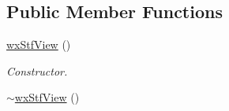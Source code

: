 \subsection*{Public Member Functions}
\begin{DoxyCompactItemize}
\item 
\hypertarget{classwxStfView_a6dc01863526872b6421facc8d7e80757}{
\hyperlink{classwxStfView_a6dc01863526872b6421facc8d7e80757}{wxStfView} ()}
\label{classwxStfView_a6dc01863526872b6421facc8d7e80757}

\begin{DoxyCompactList}\small\item\em Constructor. \item\end{DoxyCompactList}\item 
\hypertarget{classwxStfView_a3abdf823c21c263fad620a0cde30dccb}{
\hyperlink{classwxStfView_a3abdf823c21c263fad620a0cde30dccb}{$\sim$wxStfView} ()}
\label{classwxStfView_a3abdf823c21c263fad620a0cde30dccb}


\end{DoxyCompactItemize}
